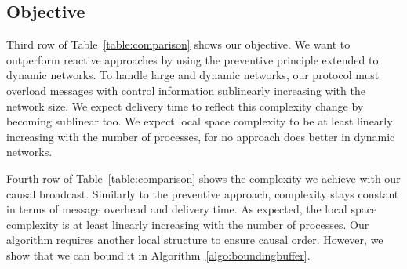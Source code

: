 \subsection{Objective}

Third row of Table~\ref{table:comparison} shows our objective. We want to
outperform reactive approaches by using the preventive principle extended to
dynamic networks. To handle large and dynamic networks, our protocol must
overload messages with control information sublinearly increasing with the
network size. We expect delivery time to reflect this complexity change by
becoming sublinear too. We expect local space complexity to be at least linearly
increasing with the number of processes, for no approach does better in dynamic
networks.

Fourth row of Table~\ref{table:comparison} shows the complexity we achieve with
our causal broadcast. Similarly to the preventive approach, complexity stays
constant in terms of message overhead and delivery time. As expected, the local
space complexity is at least linearly increasing with the number of
processes. Our algorithm requires another local structure to ensure causal
order. However, we show that we can bound it in
Algorithm~\ref{algo:boundingbuffer}.



